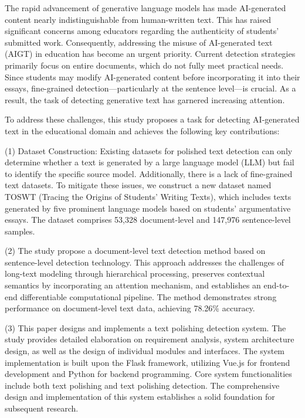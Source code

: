 \begin{abstractEn}
  The rapid advancement of generative language models has made AI-generated content nearly indistinguishable from human-written text. This has raised significant concerns among educators regarding the authenticity of students' submitted work. Consequently, addressing the misuse of AI-generated text (AIGT) in education has become an urgent priority. Current detection strategies primarily focus on entire documents, which do not fully meet practical needs. Since students may modify AI-generated content before incorporating it into their essays, fine-grained detection---particularly at the sentence level---is crucial. As a result, the task of detecting generative text has garnered increasing attention.
  
  To address these challenges, this study proposes a task for detecting AI-generated text in the educational domain and achieves the following key contributions:
  
  (1) Dataset Construction: Existing datasets for polished text detection can only determine whether a text is generated by a large language model (LLM) but fail to identify the specific source model. Additionally, there is a lack of fine-grained text datasets. To mitigate these issues, we construct a new dataset named TOSWT (Tracing the Origins of Students' Writing Texts), which includes texts generated by five prominent language models based on students' argumentative essays. The dataset comprises 53,328 document-level and 147,976 sentence-level samples.
  
  (2) The study propose a document-level text detection method based on sentence-level detection technology. This approach addresses the challenges of long-text modeling through hierarchical processing, preserves contextual semantics by incorporating an attention mechanism, and establishes an end-to-end differentiable computational pipeline. The method demonstrates strong performance on document-level text data, achieving 78.26\% accuracy.
  
  (3) This paper designs and implements a text polishing detection system. The study provides detailed elaboration on requirement analysis, system architecture design, as well as the design of individual modules and interfaces. The system implementation is built upon the Flask framework, utilizing Vue.js for frontend development and Python for backend programming. Core system functionalities include both text polishing and text polishing detection. The comprehensive design and implementation of this system establishes a solid foundation for subsequent research.
\end{abstractEn}
